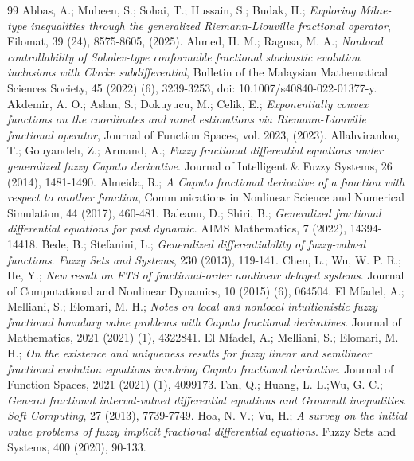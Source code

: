 \documentclass[10pt,a4paper]{amsart}
\numberwithin{equation}{section}
\begin{document}
\begin{thebibliography}{99}
 Abbas, A.; Mubeen, S.; Sohai, T.; Hussain, S.; Budak, H.;
\emph{Exploring Milne-type inequalities through the generalized Riemann-Liouville 
fractional operator}, Filomat, 39 (24), 8575-8605, (2025).
 Ahmed, H. M.; Ragusa, M. A.;
\emph{Nonlocal controllability of Sobolev-type conformable fractional stochastic 
evolution inclusions with Clarke subdifferential}, 
Bulletin of the Malaysian Mathematical Sciences Society, 45 (2022) (6), 3239-3253, 
doi: 10.1007/s40840-022-01377-y.
 Akdemir, A. O.; Aslan, S.; Dokuyucu, M.; Celik, E.;
\emph{Exponentially convex functions on the coordinates and novel estimations via
 Riemann-Liouville fractional operator}, Journal of Function Spaces, vol. 2023, (2023).
 Allahviranloo, T.; Gouyandeh, Z.; Armand, A.;
\emph{Fuzzy fractional differential equations under generalized fuzzy Caputo derivative}.
Journal of Intelligent \& Fuzzy Systems, 26  (2014), 1481-1490.
 Almeida, R.;
\emph{A Caputo fractional derivative of a function with respect to another
function}, Communications in Nonlinear Science and Numerical Simulation, 44 (2017),
 460-481.
 Baleanu, D.; Shiri, B.;
\emph{Generalized fractional differential equations for past dynamic}.
AIMS Mathematics, 7 (2022), 14394-14418.
 Bede, B.; Stefanini, L.;
\emph{Generalized differentiability of fuzzy-valued functions}. 
\emph{Fuzzy Sets and Systems}, 230 (2013), 119-141.
 Chen, L.; Wu, W. P. R.;  He, Y.;
\emph{New result on FTS of fractional-order nonlinear delayed systems}. 
Journal of Computational and Nonlinear Dynamics, 10 (2015) (6), 064504.
 El Mfadel, A.; Melliani, S.; Elomari, M. H.;
\emph{Notes on local and nonlocal intuitionistic fuzzy fractional boundary
value problems with Caputo fractional derivatives}.
Journal of Mathematics, 2021 (2021) (1), 4322841.
 El Mfadel, A.; Melliani, S.; Elomari, M. H.;
\emph{On the existence and uniqueness results for fuzzy linear and semilinear
fractional evolution equations involving Caputo fractional derivative}.
Journal of Function Spaces, 2021 (2021) (1), 4099173.
 Fan, Q.; Huang, L. L.;Wu, G. C.;
\emph{ General fractional interval-valued differential equations and Gronwall
inequalities}. \emph{Soft Computing}, 27 (2013), 7739-7749.
 Hoa, N. V.; Vu, H.;
\emph{A survey on the initial value problems of fuzzy implicit fractional
differential equations}. Fuzzy Sets and Systems,  400 (2020), 90-133.

\end{thebibliography}
\end{document}
